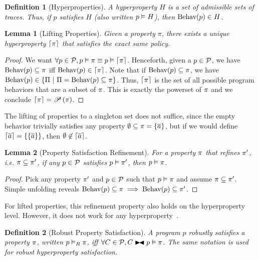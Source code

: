 \documentclass[a4paper,names,dvipsnames]{article}
\newtheorem{definition}{Definition}
\newtheorem{lemma}{Lemma}
\begin{document}
\begin{definition}[Hyperproperties]
  A hyperproperty $H$ is a set of admissible sets of traces. Thus, if $p$ satisfies $H$ (also written ${p}\vDash{H}$), then $\text{Behav}({p})\in H$.
\end{definition}

\begin{lemma}[Lifting Properties]
  Given a property $\pi$, there exists a unique hyperproperty $\left\lceil{\pi}\right\rceil$ that satisfies the exact same policy.
\end{lemma}
\begin{proof}
  We want $\forall p \in\mathcal{P}, {p}\vDash{\pi}\equiv{p}\vDash{\left\lceil{\pi}\right\rceil}$.
  Henceforth, given a $p\in\mathcal{P}$, we have $\text{Behav}({p})\subseteq\pi$ iff $\text{Behav}({p})\in\left\lceil{\pi}\right\rceil$.
  Note that if $\text{Behav}({p})\subseteq\pi$, we have $\behav{p}\in\left\{\Pi\ |\ \Pi=\behav{p}\subseteq\prop\right\}$.
  Thus, $\left\lceil{\pi}\right\rceil$ is the set of all possible program behaviors that are a subset of $\pi$.
  This is exactly the powerset of $\pi$ and we conclude $\left\lceil{\pi}\right\rceil=\mathscr{P}\left({\pi}\right)$.
\end{proof}
\noindent
The lifting of properties to a singleton set does not suffice, since the empty behavior trivially satisfies any property $\emptyset\subseteq\pi=\{\overline{a}\}$, but if we would define $\left\lceil{\overline{a}}\right\rceil=\{\{\overline{a}\}\}$, then $\emptyset\not\in\left\lceil{\overline{a}}\right\rceil$.

\begin{lemma}[Property Satisfaction Refinement]
  For a property $\pi$ that refines $\pi'$, i.e. $\pi\subseteq\pi'$, if any $p\in\mathcal{P}$ satisfies ${p}\vDash{\pi'}$, then ${p}\vDash{\pi}$.
\end{lemma}
\begin{proof}
  Pick any property $\pi'$ and $p\in\mathcal{P}$ such that ${p}\vDash{\pi}$ and assume $\pi\subseteq\pi'$.
  Simple unfolding reveals $\text{Behav}({p})\subseteq\pi\implies\text{Behav}({p})\subseteq\pi'$.
\end{proof}
\noindent
For lifted properties, this refinement property also holds on the hyperproperty level.
However, it does not work for any hyperproperty~\cite{clarkson08}.

\begin{definition}[Robust Property Satisfaction]
  A program $p$ robustly satisfies a property $\pi$, written ${p}\vDash_{\scriptstyle R}{\pi}$, iff $\forall C\in\partials,\sat{C\linker p}{\prop}$. The same notation is used for robust hyperproperty satisfaction.
\end{definition}
\end{document}
